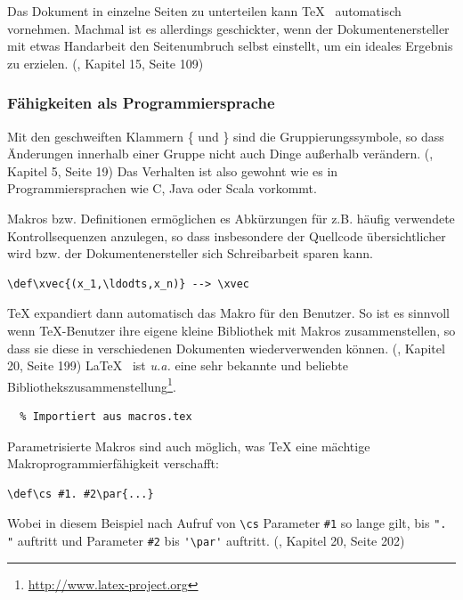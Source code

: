Das Dokument in einzelne Seiten zu unterteilen kann \TeX~ automatisch
vornehmen. Machmal ist es allerdings geschickter, wenn der Dokumentenersteller
mit etwas Handarbeit den Seitenumbruch selbst einstellt, um ein ideales
Ergebnis zu erzielen. (\cite{tex-a}, Kapitel 15, Seite 109)

\subsubsection{Fähigkeiten als Programmiersprache}

Mit den geschweiften Klammern \{ und \} sind die Gruppierungssymbole, so
dass Änderungen innerhalb einer Gruppe nicht auch Dinge außerhalb
verändern. (\cite{tex-a}, Kapitel 5, Seite 19)
Das Verhalten ist also gewohnt wie es in Programmiersprachen wie C,
Java oder Scala vorkommt.

Makros bzw. Definitionen ermöglichen es Abkürzungen für z.B. häufig
verwendete Kontrollsequenzen anzulegen, so dass insbesondere
der Quellcode übersichtlicher wird bzw. der Dokumentenersteller sich
Schreibarbeit sparen kann.

\begin{verbatim}
\def\xvec{(x_1,\ldodts,x_n)} --> \xvec
\end{verbatim}

TeX expandiert dann automatisch das Makro für den Benutzer.
So ist es sinnvoll wenn TeX-Benutzer ihre eigene kleine Bibliothek mit
Makros zusammenstellen, so dass sie diese in verschiedenen Dokumenten
wiederverwenden können. (\cite{tex-a}, Kapitel 20, Seite 199)
\LaTeX~ ist \emph{u.a.} eine sehr bekannte und beliebte
Bibliothekszusammenstellung\footnote{\url{http://www.latex-project.org}}.

\begin{verbatim}
  % Importiert aus macros.tex
\end{verbatim}

Parametrisierte Makros sind auch möglich, was TeX eine mächtige
Makroprogrammierfähigkeit verschafft:

\begin{verbatim}
\def\cs #1. #2\par{...}
\end{verbatim}

Wobei in diesem Beispiel nach Aufruf von \lstinline|\cs| Parameter
\lstinline|#1| so lange gilt,
bis \lstinline|". "| auftritt und Parameter \lstinline|#2|
bis \lstinline|'\par'| auftritt. (\cite{tex-a}, Kapitel 20, Seite 202)

